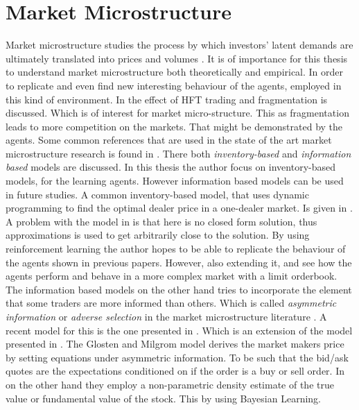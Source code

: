 \documentclass{kththesis}
\theoremstyle{definition}
\begin{document}
\section{Market Microstructure}
Market microstructure studies the process by which investors' latent demands are ultimately translated into prices and volumes \parencite{madhavan2000market}. It is of importance for this thesis to understand market microstructure both theoretically and empirical. In order to replicate and even find new interesting behaviour of the agents, employed in this kind of environment. In \textcite{haferkorn2017high, agarwal2012high} the effect of HFT trading and fragmentation is discussed. Which is of interest for market micro-structure. This as fragmentation leads to more competition on the markets. That might be demonstrated by the agents. Some common references that are used in the state of the art market microstructure research is found in \parencite{o1995market,hasbrouck2007empirical, madhavan2000market, madhavan2002market}. There both \textit{inventory-based} and \textit{information based} models are discussed. In this thesis the author focus on inventory-based models, for the learning agents. However information based models can be used in future studies.
\newline
\newline
A common inventory-based model, that uses dynamic programming to find the optimal dealer price in a one-dealer market. Is given in \textcite{ho1981optimal}. A problem with the model in \parencite{ho1981optimal} is that here is no closed form solution, thus approximations is used to get arbitrarily close to the solution. By using reinforcement learning the author hopes to be able to replicate the behaviour of the agents shown in previous papers. However, also extending it, and see how the agents perform and behave in a more complex market with a limit orderbook. The information based models on the other hand tries to incorporate the element that some traders are more informed than others. Which is called \textit{asymmetric information} or \textit{adverse selection} in the market microstructure literature \parencite{o1995market, hasbrouck2007empirical}. 
\newline
\newline
A recent model for this is the one presented in \parencite{das2003intelligent, das2005learning}. Which is an extension of the model presented in \textcite{glosten1985bid}. The Glosten and Milgrom model derives the market makers price by setting equations under asymmetric information. To be such that the bid/ask quotes are the expectations conditioned on if the order is a buy or sell order. In \textcite{das2005learning} on the other hand they employ a non-parametric density estimate of the true value or fundamental value of the stock. This by using Bayesian Learning. 
\end{document}
